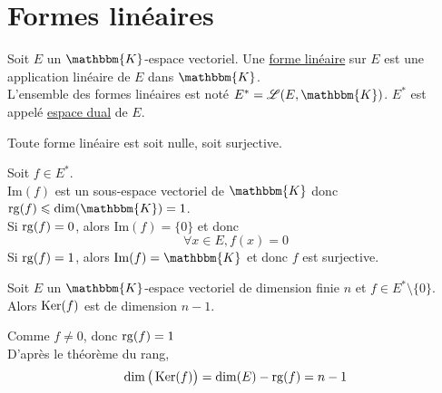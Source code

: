 \part{Formes linéaires}

\begin{defn}
	Soit $E$ un $\mathbbm{K}$-espace vectoriel. Une \underline{forme linéaire} sur $E$ est une application linéaire de $E$ dans $\mathbbm{K}$.\\
	L'ensemble des formes linéaires est noté $E^* = \mathcal{L}(E, \mathbbm{K})$. $E^*$ est appelé \underline{espace dual} de $E$.
\end{defn}

\begin{prop}
	Toute forme linéaire est soit nulle, soit surjective.
\end{prop}

\begin{prv}
	Soit $f \in E^*$.\\
	$\mathrm{Im}(f)$ est un sous-espace vectoriel de $\mathbbm{K}$ donc $\rg(f) \le \dim(\mathbbm{K}) = 1$.\\
	Si $\operatorname{rg}(f) = 0$, alors $\mathrm{Im}(f) = \{0\}$ et donc \[
		\forall x \in E, f(x) = 0
	\]
	Si $\operatorname{rg}(f) = 1$, alors $\mathrm{Im}(f) = \mathbbm{K}$ et donc $f$ est surjective.
\end{prv}

\begin{prop}
	Soit $E$ un $\mathbbm{K}$-espace vectoriel de dimension finie $n$ et $f \in E^* \setminus \{0\}$. Alors $\operatorname{Ker}(f)$ est de dimension $n-1$.
\end{prop}

\begin{prv}
	Comme $f \neq 0$, donc $\operatorname{rg}(f) = 1$ \\
	D'après le théorème du rang, \[
		\dim\big(\operatorname{Ker}(f)\big) = \dim(E) - \operatorname{rg}(f) = n - 1
	\]
\end{prv}

